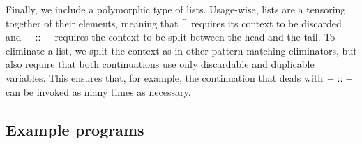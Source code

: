 Finally, we include a polymorphic type of lists.
Usage-wise, lists are a tensoring together of their elements, meaning that
$[]$ requires its context to be discarded and $- :: -$ requires the
context to be split between the head and the tail.
To eliminate a list, we split the context as in other pattern matching
eliminators, but also require that both continuations use only discardable
and duplicable variables.
This ensures that, for example, the continuation that deals with $- :: -$
can be invoked as many times as necessary.



\subsection{Example programs}

